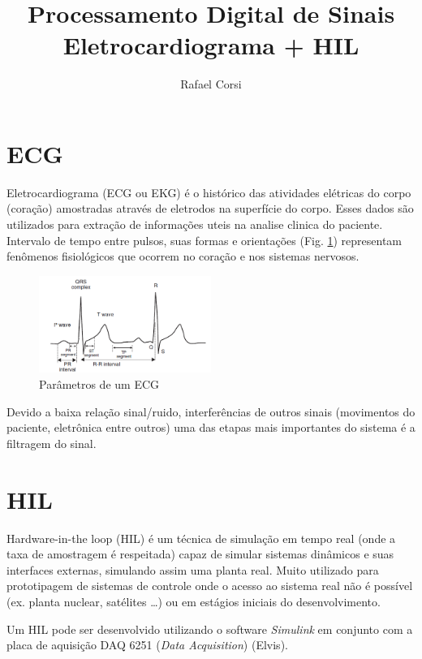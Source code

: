 \documentclass[11pt,a4paper]{scrartcl}
\title{Processamento Digital de Sinais\\ Eletrocardiograma + HIL}
\author{Rafael Corsi}
\begin{document}
\maketitle

\section{ECG}

Eletrocardiograma (ECG ou EKG) é o histórico das atividades elétricas do corpo (coração) amostradas através de eletrodos na superfície do corpo. Esses dados são utilizados para extração de informações uteis na analise clinica do paciente. Intervalo de tempo entre pulsos, suas formas e orientações (Fig. \ref{fig:parametros:ecg}) representam fenômenos fisiológicos que ocorrem no coração e nos sistemas nervosos.

\begin{figure}[!ht]
\centering
\includegraphics[width=0.5\textwidth]{figs/ecg.png}
\caption{Parâmetros de um ECG}
\label{fig:parametros:ecg}
\end{figure}

Devido a baixa relação sinal/ruido, interferências de outros sinais (movimentos do paciente, eletrônica entre outros) uma das etapas mais importantes do sistema é a filtragem do sinal. 

\section{HIL}

Hardware-in-the loop (HIL) é um técnica de simulação em tempo real (onde a taxa de amostragem é respeitada) capaz de simular sistemas dinâmicos e suas interfaces externas, simulando assim uma planta real. Muito utilizado para prototipagem de sistemas de controle onde o acesso ao sistema real não é possível (ex. planta nuclear, satélites \ldots) ou em estágios iniciais do desenvolvimento. 

Um HIL pode ser desenvolvido utilizando o software \textit{Simulink} em conjunto com a placa de aquisição DAQ 6251 (\textit{Data Acquisition}) (Elvis).
\end{document}
